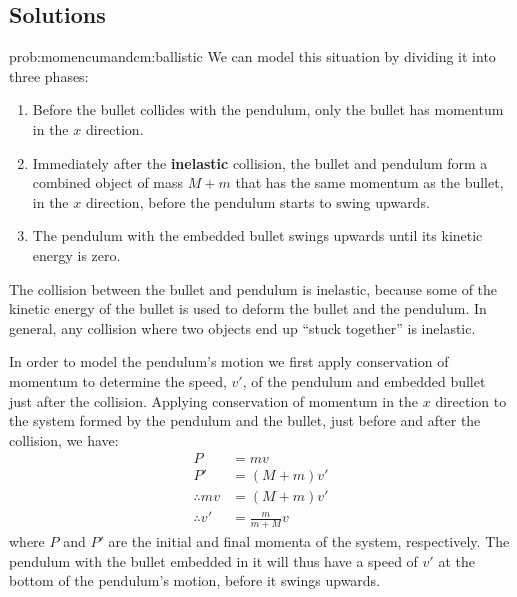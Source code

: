 \newpage
\subsection{Solutions}
\begin{solution}{prob:momencumandcm:ballistic}\label{soln:momentumandcm:ballistic}
We can model this situation by dividing it into three phases:
\begin{enumerate}
\item Before the bullet collides with the pendulum, only the bullet has momentum in the $x$ direction.
\item Immediately after the \textbf{inelastic} collision, the bullet and pendulum form a combined object of mass $M+m$ that has the same momentum as the bullet, in the $x$ direction, before the pendulum starts to swing upwards.
\item The pendulum with the embedded bullet swings upwards until its kinetic energy is zero.
\end{enumerate}
The collision between the bullet and pendulum is inelastic, because some of the kinetic energy of the bullet is used to deform the bullet and the pendulum. In general, any collision where two objects end up ``stuck together'' is inelastic.

In order to model the pendulum's motion we first apply conservation of momentum to determine the speed, $v'$, of the pendulum and embedded bullet just after the collision. Applying conservation of momentum in the $x$ direction to the system formed by the pendulum and the bullet, just before and after the collision, we have:
\begin{align*}
P &= mv\\
P' &= (M+m)v'\\
\therefore mv &= (M+m)v'\\
\therefore v' &= \frac{m}{m+M}v
\end{align*}
where $P$ and $P'$ are the initial and final momenta of the system, respectively. The pendulum with the bullet embedded in it will thus have a speed of $v'$ at the bottom of the pendulum's motion, before it swings upwards. 


\end{solution}

